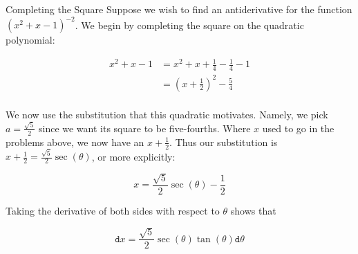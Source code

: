 \begin{example}{Completing the Square}
Suppose we wish to find an antiderivative for the function $\left(x^2+x-1\right)^{-2}$.  We begin by completing the square on the quadratic polynomial:

\begin{align*}
x^2+x-1&=x^2+x+\frac{1}{4}-\frac{1}{4}-1 \\
       &=\left(x+\frac{1}{2}\right)^2-\frac{5}{4} \\ 
\end{align*}

We now use the substitution that this quadratic motivates.  Namely, we pick $a=\frac{\sqrt{5}}{2}$ since we want its square to be five-fourths.  Where $x$ used to go in the problems above, we now have an $x+\frac{1}{2}$.  Thus our substitution is $ x+\frac{1}{2}=\frac{\sqrt{5}}{2}\sec(\theta)$, or more explicitly:

$$  x=\frac{\sqrt{5}}{2}\sec(\theta)-\frac{1}{2} $$

Taking the derivative of both sides with respect to $\theta$ shows that 

$$  \mathtt{d}x=\frac{\sqrt{5}}{2}\sec(\theta)\tan(\theta) \mathtt{d}\theta $$

\end{example}

